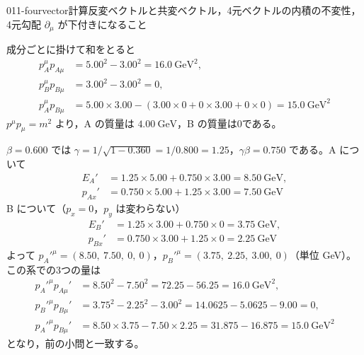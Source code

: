 \documentclass[uplatex,dvipdfmx,a4paper,11pt]{jsarticle}
\begin{document}
\begin{mondai}{011-fourvector}{計算}{反変ベクトルと共変ベクトル，4元ベクトルの内積の不変性，4元勾配 $\partial_\mu$ が下付きになること}
\begin{tadashii}
成分ごとに掛けて和をとると
\begin{align*}
  p_A^\mu p_{A\mu}&=5.00^2-3.00^2=\qty{16.0}{\giga\electronvolt\squared},\\
  p_B^\mu p_{B\mu}&=3.00^2-3.00^2=0,\\
  p_A^\mu p_{B\mu}&=5.00\times3.00-(3.00\times0+0\times3.00+0\times0)=\qty{15.0}{\giga\electronvolt\squared}
\end{align*}
$p^\mu p_\mu=m^2$ より，A の質量は $\qty{4.00}{\giga\electronvolt}$，B の質量は0である。

 $\beta=0.600$ では $\gamma=1/\sqrt{1-0.360}=1/0.800=1.25$，$\gamma\beta=0.750$ である。A について
\begin{align*}
  E_A'&=1.25\times5.00+0.750\times3.00=\qty{8.50}{\giga\electronvolt},\\
  p_{Ax}'&=0.750\times5.00+1.25\times3.00=\qty{7.50}{\giga\electronvolt}
\end{align*}
B について（$p_x=0$，$p_y$ は変わらない）
\begin{align*}
  E_B'&=1.25\times3.00+0.750\times0=\qty{3.75}{\giga\electronvolt},\\
  p_{Bx}'&=0.750\times3.00+1.25\times0=\qty{2.25}{\giga\electronvolt}
\end{align*}
よって $p_A'^\mu=(8.50,\ 7.50,\ 0,\ 0)$，$p_B'^\mu=(3.75,\ 2.25,\ 3.00,\ 0)$（単位 \unit{\giga\electronvolt}）。この系での3つの量は
\begin{align*}
  p_A'^\mu p_{A\mu}'&=8.50^2-7.50^2=72.25-56.25=\qty{16.0}{\giga\electronvolt\squared},\\
  p_B'^\mu p_{B\mu}'&=3.75^2-2.25^2-3.00^2=14.0625-5.0625-9.00=0,\\
  p_A'^\mu p_{B\mu}'&=8.50\times3.75-7.50\times2.25=31.875-16.875=\qty{15.0}{\giga\electronvolt\squared}
\end{align*}
となり，前の小問と一致する。


\end{tadashii}
\end{mondai}
\end{document}
